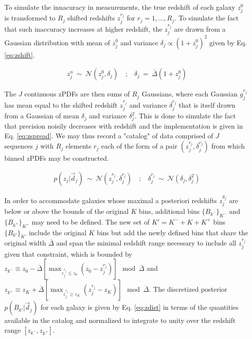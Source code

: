 \documentclass[preprint]{aastex}
\begin{document}
To simulate the innacuracy in measurements, the true redshift of each galaxy $z_{j}^{0}$ is transformed to $R_{j}$ shifted redshifts $z^{r_{j}}_{j}$ for $r_{j}=1,\dots,R_{j}$.  To simulate the fact that such inaccuracy increases at higher redshift, the $z^{r_{j}}_{j}$ are drawn from a Gaussian distribution with mean of $z_{j}^{0}$ and variance $\delta_{j}\propto(1+z_{j}^{0})^{2}$ given by Eq. \ref{eq:zshift}.  

\begin{eqnarray}
\label{eq:zshift}
z^{n}_{j}\ \sim\ \mathcal{N}(z_{j}^{0},\delta_{j})\ &;&\ \delta_{j}\ =\ \bar{\Delta}(1+z^{0}_{j})
\end{eqnarray}

The $J$ continuous zPDFs are then sums of $R_{j}$ Gaussians, where each Gaussian $g_{j}^{r_{j}}$ has mean equal to the shifted redshift $z^{r_{j}}_{j}$ and variance $\delta^{r_{j}}_{j}$ that is itself drawn from a Gaussian of mean $\delta_{j}$ and variance $\delta_{j}^{2}$.  This is done to simulate the fact that precision noisily decreases with redshift and the implementation is given in Eq. \ref{eq:zspread}.  We may thus record a "catalog" of data comprised of $J$ sequences $j$ with $R_{j}$ elements $r_{j}$ each of the form of a pair $(z^{r_{j}}_{j},\delta^{r_{j}}_{j})$ from which binned zPDFs may be constructed.  

\begin{eqnarray}
\label{eq:zspread}
p(z_{j}|\vec{d}_{j})\ \sim\ \mathcal{N}(z^{r_{j}}_{j},\delta^{r_{j}}_{j})\ &;&\ \delta^{r_{j}}_{j}\ \sim\ \mathcal{N}(\delta_{j},\delta_{j}^{2})
\end{eqnarray}

In order to accommodate galaxies whose maximal a posteriori redshifts $z^{g_{j}}_{j}$ are below or above the bounds of the original $K$ bins, additional bins $\{B_{k^{-}}\}_{K^{-}}$ and $\{B_{k^{+}}\}_{K^{+}}$ may need to be defined.  The new set of $K'=K^{-}+K+K^{+}$ bins $\{B_{k'}\}_{K'}$ include the original $K$ bins but add the newly defined bins that share the original width $\bar{\Delta}$ and span the minimal redshift range necessary to include all $z^{r_{j}}_{j}$ given that constraint, which is bounded by $z_{k^{-}}\equiv z_{0}-\bar{\Delta}[\max_{z^{r_{j}}_{j}\leq z_{0}}(z_{0}-z^{r_{j}}_{j})]\mod\bar{\Delta}$ and $z_{k^{+}}\equiv z_{K}+\bar{\Delta}[\max_{z^{r_{j}}_{j}\geq z_{K}}(z^{r_{j}}_{j}-z_{K})]\mod\bar{\Delta}$.  The discretized posterior $p(B_{k'}|\vec{d}_{j})$ for each galaxy is given by Eq. \ref{eq:zdist} in terms of the quantities available in the catalog and normalized to integrate to unity over the redshift range $[z_{k^{-}},z_{k^{+}}]$.  
\end{document}
